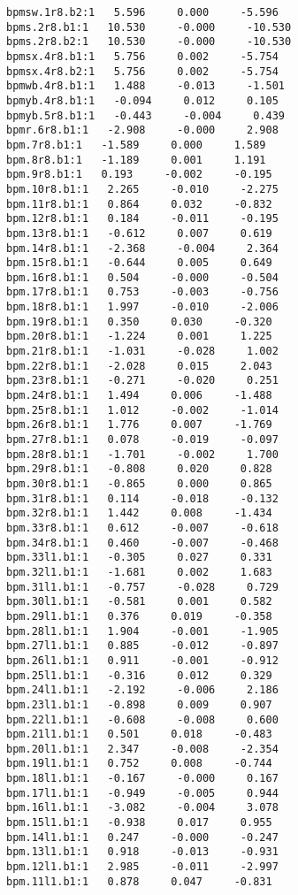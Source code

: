 \begin{verbatim}
bpmsw.1r8.b2:1   5.596     0.000     -5.596
bpms.2r8.b1:1   10.530     -0.000     -10.530
bpms.2r8.b2:1   10.530     -0.000     -10.530
bpmsx.4r8.b1:1   5.756     0.002     -5.754
bpmsx.4r8.b2:1   5.756     0.002     -5.754
bpmwb.4r8.b1:1   1.488     -0.013     -1.501
bpmyb.4r8.b1:1   -0.094     0.012     0.105
bpmyb.5r8.b1:1   -0.443     -0.004     0.439
bpmr.6r8.b1:1   -2.908     -0.000     2.908
bpm.7r8.b1:1   -1.589     0.000     1.589
bpm.8r8.b1:1   -1.189     0.001     1.191
bpm.9r8.b1:1   0.193     -0.002     -0.195
bpm.10r8.b1:1   2.265     -0.010     -2.275
bpm.11r8.b1:1   0.864     0.032     -0.832
bpm.12r8.b1:1   0.184     -0.011     -0.195
bpm.13r8.b1:1   -0.612     0.007     0.619
bpm.14r8.b1:1   -2.368     -0.004     2.364
bpm.15r8.b1:1   -0.644     0.005     0.649
bpm.16r8.b1:1   0.504     -0.000     -0.504
bpm.17r8.b1:1   0.753     -0.003     -0.756
bpm.18r8.b1:1   1.997     -0.010     -2.006
bpm.19r8.b1:1   0.350     0.030     -0.320
bpm.20r8.b1:1   -1.224     0.001     1.225
bpm.21r8.b1:1   -1.031     -0.028     1.002
bpm.22r8.b1:1   -2.028     0.015     2.043
bpm.23r8.b1:1   -0.271     -0.020     0.251
bpm.24r8.b1:1   1.494     0.006     -1.488
bpm.25r8.b1:1   1.012     -0.002     -1.014
bpm.26r8.b1:1   1.776     0.007     -1.769
bpm.27r8.b1:1   0.078     -0.019     -0.097
bpm.28r8.b1:1   -1.701     -0.002     1.700
bpm.29r8.b1:1   -0.808     0.020     0.828
bpm.30r8.b1:1   -0.865     0.000     0.865
bpm.31r8.b1:1   0.114     -0.018     -0.132
bpm.32r8.b1:1   1.442     0.008     -1.434
bpm.33r8.b1:1   0.612     -0.007     -0.618
bpm.34r8.b1:1   0.460     -0.007     -0.468
bpm.33l1.b1:1   -0.305     0.027     0.331
bpm.32l1.b1:1   -1.681     0.002     1.683
bpm.31l1.b1:1   -0.757     -0.028     0.729
bpm.30l1.b1:1   -0.581     0.001     0.582
bpm.29l1.b1:1   0.376     0.019     -0.358
bpm.28l1.b1:1   1.904     -0.001     -1.905
bpm.27l1.b1:1   0.885     -0.012     -0.897
bpm.26l1.b1:1   0.911     -0.001     -0.912
bpm.25l1.b1:1   -0.316     0.012     0.329
bpm.24l1.b1:1   -2.192     -0.006     2.186
bpm.23l1.b1:1   -0.898     0.009     0.907
bpm.22l1.b1:1   -0.608     -0.008     0.600
bpm.21l1.b1:1   0.501     0.018     -0.483
bpm.20l1.b1:1   2.347     -0.008     -2.354
bpm.19l1.b1:1   0.752     0.008     -0.744
bpm.18l1.b1:1   -0.167     -0.000     0.167
bpm.17l1.b1:1   -0.949     -0.005     0.944
bpm.16l1.b1:1   -3.082     -0.004     3.078
bpm.15l1.b1:1   -0.938     0.017     0.955
bpm.14l1.b1:1   0.247     -0.000     -0.247
bpm.13l1.b1:1   0.918     -0.013     -0.931
bpm.12l1.b1:1   2.985     -0.011     -2.997
bpm.11l1.b1:1   0.878     0.047     -0.831

\end{verbatim}
